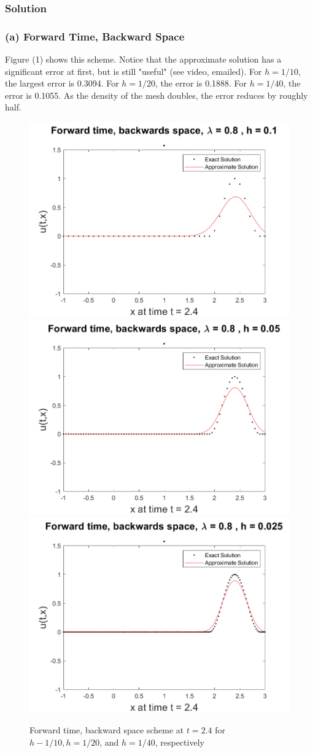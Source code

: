 \documentclass[12pt]{article}
\begin{document}
\subsubsection*{Solution}

\subsubsection*{(a) Forward Time, Backward Space}

Figure (1) shows this scheme. Notice that the approximate solution has a significant error at first, but is still "useful" (see video, emailed). For $h=1/10$, the largest error is 0.3094. For $h=1/20$, the error is 0.1888. For $h=1/40$, the error is 0.1055. As the density of the mesh doubles, the error reduces by roughly half.

\begin{figure}
	\centering
	\includegraphics[width=.6\linewidth]{./code/a_forward_time_backward_space_1_10th.png}	\includegraphics[width=.6\linewidth]{./code/a_forward_time_backward_space_1_20th.png}
	\includegraphics[width=.6\linewidth]{./code/a_forward_time_backward_space_1_40th.png}
	\caption{Forward time, backward space scheme at $t=2.4$ for $h-1/10, h=1/20$, and $h=1/40$, respectively}
\end{figure}
\end{document}
